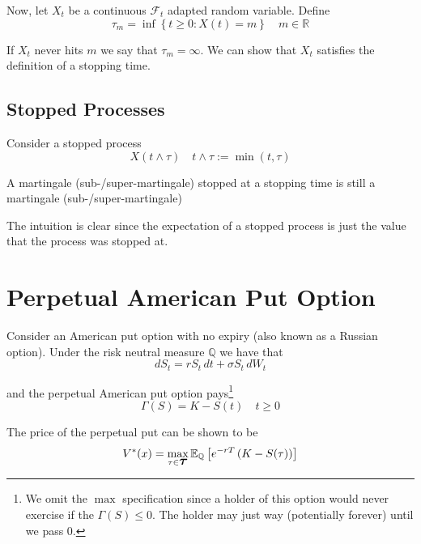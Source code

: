 \documentclass[12pt]{article}
\newenvironment{theorem}[2][Theorem:]{\begin{trivlist} %
\item[\hskip \labelsep {\bfseries #1}\hskip \labelsep {\bfseries #2.}]}{\end{trivlist}}
\newlength\tindent
\renewcommand{\indent}{\hspace*{\tindent}}
\newcommand{\R}{\mathbb R}
\newcommand{\Q}{\mathbb Q}
\newcommand{\E}{\mathbb E}
\newcommand{\bigtau}{\text{{\large $\bm \tau$}}}
\begin{document}
Now, let $X_t$ be a continuous $\mathcal F_t$ adapted random variable. Define
\begin{equation*}
	\tau_m = \inf \left\{ t \geq 0: X(t) = m \right\} \quad m \in \R
\end{equation*}

If $X_t$ never hits $m$ we say that $\tau_m = \infty$. We can show that $X_t$ satisfies the definition of a stopping time.

\subsection{Stopped Processes}

Consider a stopped process
\begin{equation*}
	X(t \land \tau) \quad t \land \tau := \min(t, \tau)
\end{equation*}

\begin{theorem}{Optimal Sampling Theorem} A martingale (sub-/super-martingale) stopped at a stopping time is still a martingale (sub-/super-martingale)
\end{theorem}

\indent The intuition is clear since the expectation of a stopped process is just the value that the process was stopped at.

\section{Perpetual American Put Option}

\indent Consider an American put option with no expiry (also known as a Russian option). Under the risk neutral measure $\Q$ we have that
\begin{equation*}
	dS_t = rS_t\,dt + \sigma S_t\,dW_t
\end{equation*}

and the perpetual American put option pays\footnote{We omit the $\max$ specification since a holder of this option would never exercise if the $\Gamma(S) \leq 0$. The holder may just way (potentially forever) until we pass 0.}
\begin{equation*}
	\Gamma(S) = K - S(t) \quad t \geq 0
\end{equation*}

The price of the perpetual put can be shown to be
\begin{equation*}
	V^*(x) = \max_{\tau \in \bigtau} \E_\Q \left[ e^{-rT} \left(K - S(\tau) \right)\right]
\end{equation*}
\end{document}
